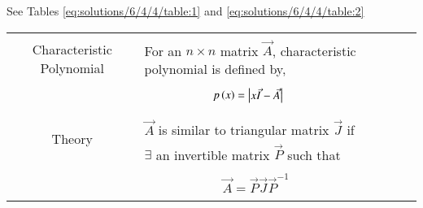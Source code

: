 See Tables     \ref{eq:solutions/6/4/4/table:1}
and     \ref{eq:solutions/6/4/4/table:2}
%
\begin{table*}[ht!]
\centering
\begin{tabular}{|c|l|}
    \hline
	\multirow{3}{*}{Characteristic Polynomial} 
	& \\
	& For an $n\times n$ matrix $\vec{A}$, characteristic polynomial is defined by,\\
	&\\
	& $\qquad\qquad\qquad p\left(x\right)=\begin{vmatrix}x\Vec{I}-\Vec{A}\end{vmatrix}$\\
	&\\
	\hline
	\multirow{3}{*}{Theory}
    &\\
    & $\vec{A}$ is similar to triangular matrix $\vec{J}$ if\\
    & $\exists$ an invertible matrix $\vec{P}$ such that\\
    &\\
    & $\qquad \qquad \qquad \vec{A}=\Vec{P}\vec{J}\vec{P}^{-1}$\\
    &\\
    \hline
\end{tabular}
    \caption{Definitions}
\label{eq:solutions/6/4/4/table:1}
\end{table*}
\onecolumn
